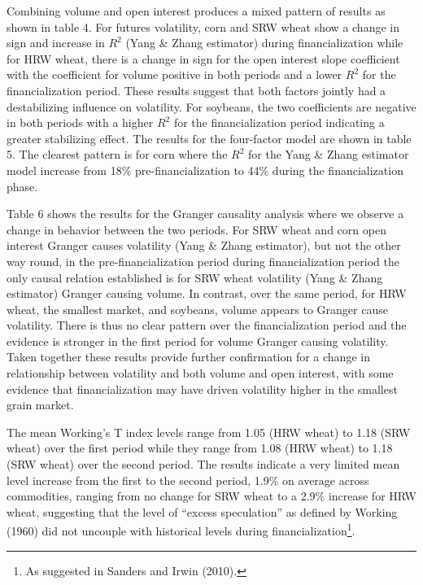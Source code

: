 \documentclass[]{elsarticle} %
\begin{document}
Combining volume and open interest produces a mixed pattern of results
as shown in table 4. For futures volatility, corn and SRW wheat show a
change in sign and increase in \(R^{2}\) (Yang \& Zhang estimator)
during financialization while for HRW wheat, there is a change in sign
for the open interest slope coefficient with the coefficient for volume
positive in both periods and a lower \(R^{2}\) for the financialization
period. These results suggest that both factors jointly had a
destabilizing influence on volatility. For soybeans, the two
coefficients are negative in both periods with a higher \(R^{2}\) for
the financialization period indicating a greater stabilizing effect. The
results for the four-factor model are shown in table 5. The clearest
pattern is for corn where the \(R^{2}\) for the Yang \& Zhang estimator
model increase from 18\% pre-financialization to 44\% during the
financialization phase.

Table 6 shows the results for the Granger causality analysis where we
observe a change in behavior between the two periods. For SRW wheat and
corn open interest Granger causes volatility (Yang \& Zhang estimator),
but not the other way round, in the pre-financialization period during
financialization period the only causal relation established is for SRW
wheat volatility (Yang \& Zhang estimator) Granger causing volume. In
contrast, over the same period, for HRW wheat, the smallest market, and
soybeans, volume appears to Granger cause volatility. There is thus no
clear pattern over the financialization period and the evidence is
stronger in the first period for volume Granger causing volatility.
Taken together these results provide further confirmation for a change
in relationship between volatility and both volume and open interest,
with some evidence that financialization may have driven volatility
higher in the smallest grain market.

The mean Working's T index levels range from 1.05 (HRW wheat) to 1.18
(SRW wheat) over the first period while they range from 1.08 (HRW wheat)
to 1.18 (SRW wheat) over the second period. The results indicate a very
limited mean level increase from the first to the second period, 1.9\%
on average across commodities, ranging from no change for SRW wheat to a
2.9\% increase for HRW wheat, suggesting that the level of ``excess
speculation'' as defined by Working (1960) did not uncouple with
historical levels during financialization\footnote{As suggested in
  Sanders and Irwin (2010).}.
\end{document}
